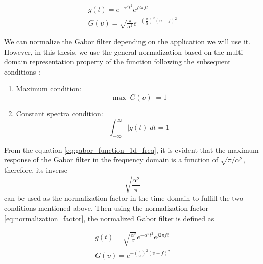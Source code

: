 \begin{equation}\label{eq:gabor_function_1d_timefreq_compact}
    \begin{gathered}
         g(t) =  e ^{-\alpha^2 t^2} e ^{j 2 \pi f t } \\
         G(\upsilon) =  \sqrt{\frac{\pi}{\alpha^2}} e ^{-\left(\frac{\pi}{\alpha}\right) ^{2} (\upsilon-f)^2} 
     \end{gathered}
\end{equation}

We can normalize the Gabor filter depending on the application we will use it. However, in this thesis, we use the general normalization based on the multi-domain representation property of the function following the subsequent conditions \citep{Boukerroui.Noble.ea:JMIV:2004}:

\begin{enumerate}
    \item Maximum condition:
        \begin{equation}\label{eq:maximun_condition}
            \max{|G(\upsilon)|} = 1
        \end{equation}
    \item Constant spectra condition:
        \begin{equation}\label{eq:constant_spectrum_condition}
            \int_{-\infty}^{\infty} |g(t)| dt = 1
        \end{equation}        
\end{enumerate}

From the equation \eqref{eq:gabor_function_1d_freq}, it is evident that the maximum response of the Gabor filter in the frequency domain is a function of $\sqrt{\pi/\alpha^2}$, therefore, its inverse
\begin{equation}\label{eq:normalization_factor}
    \sqrt{\frac{\alpha^2}{\pi}}
\end{equation}
can be used as the normalization factor in the time domain to fulfill the two conditions mentioned above. Then using the normalization factor \eqref{eq:normalization_factor}, the normalized Gabor filter is defined as

\begin{equation}\label{eq:gabor_function_1d_timefreq_normalized}
    \begin{gathered}
         g(t) =  \sqrt{\frac{\alpha^2}{\pi}} e ^{-\alpha^2 t^2} e ^{j 2 \pi f t } \\
         G(\upsilon) =  e ^{-\left(\frac{\pi}{\alpha}\right) ^2 (\upsilon-f)^2}
     \end{gathered}
\end{equation}

